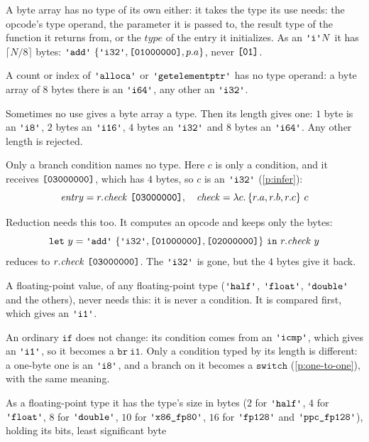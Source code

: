 \documentclass[11pt,letterpaper]{article}
\newcommand{\lam}[2]{\lambda #1.\,#2}       %
\newcommand{\kw}[1]{\mathtt{#1}}
\newcommand{\str}[1]{\text{\ttfamily\textquotesingle #1\textquotesingle}}  %
\newcommand{\hex}[1]{\text{\ttfamily [#1]}}  %
\newcounter{pt}
\newcommand{\pref}[1]{\ref{#1}}  %
\begin{document}
\begin{points}
\begin{subpoints}
  \end{subpoints}
\item\label{p:bytes-type} A byte array has no type of its own either: it takes the type its use needs: the
  opcode's type operand, the parameter it is passed to, the result type of the function it returns from, or
  the $\mathit{type}$ of the entry it initializes. As an $\str{i}N$ it has $\lceil N/8 \rceil$ bytes:
  $\str{add}\ \{\str{i32}, \hex{01000000}, p.a\}$, never $\hex{01}$.
  \begin{subpoints}
  \item A count or index of $\str{alloca}$ or $\str{getelementptr}$ has no type operand: a byte array of $8$ bytes there is an
    $\str{i64}$, any other an $\str{i32}$.
  \item \label{p:bytes-length}Sometimes no use gives a byte array a type. Then its length gives one: $1$ byte is an
    $\str{i8}$, $2$ bytes an $\str{i16}$, $4$ bytes an $\str{i32}$ and $8$ bytes an $\str{i64}$. Any other length is rejected.
  \item Only a branch condition names no type. Here $c$ is only a condition, and it receives $\hex{03000000}$, which
    has $4$ bytes, so $c$ is an $\str{i32}$ (\pref{p:infer}):
    \[\mathit{entry} = r.\mathit{check}\ \hex{03000000},\quad \mathit{check} = \lam{c}{\{r.a, r.b, r.c\}\ c}\]
  \item Reduction needs this too. It computes an opcode and keeps only the bytes:
    \[\kw{let}\ y = \str{add}\ \{\str{i32}, \hex{01000000}, \hex{02000000}\}\ \kw{in}\ r.\mathit{check}\ y\]
    reduces to $r.\mathit{check}\ \hex{03000000}$. The $\str{i32}$ is gone, but the $4$ bytes give it back.
  \item A floating-point value, of any floating-point type ($\str{half}$, $\str{float}$, $\str{double}$ and the others), never
    needs this: it is never a condition. It is compared first, which gives an $\str{i1}$.
  \item An ordinary $\kw{if}$ does not change: its condition comes from an $\str{icmp}$, which gives an $\str{i1}$, so
    it becomes a $\kw{br\ i1}$. Only a condition typed by its length is different: a one-byte one is an $\str{i8}$, and a
    branch on it becomes a $\kw{switch}$ (\pref{p:one-to-one}), with the same meaning.
  \item As a floating-point type it has the type's size in bytes ($2$ for $\str{half}$, $4$ for $\str{float}$, $8$ for
    $\str{double}$, $10$ for $\str{x86\_fp80}$, $16$ for $\str{fp128}$ and $\str{ppc\_fp128}$), holding its bits, least significant byte

\end{subpoints}
\end{points}
\end{document}

